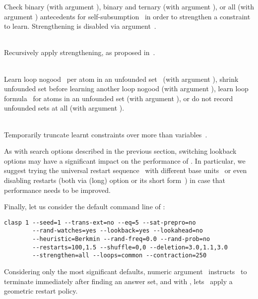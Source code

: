 \begin{description}
Check binary (with argument ),
binary and ternary (with argument ), or 
all (with argument ) antecedents for
self-subsumption~\cite{eenbie05a}
in order to strengthen a constraint to learn.
Strengthening is disabled via argument~.
\item[\code{--recursive-str}]~\\
Recursively apply strengthening, as proposed in~\cite{soreen05a}.
\item[\code{--loops common|distinct|shared|no}]~\\
Learn loop nogood~\cite{gekanesc07a} per atom in an unfounded set~\cite{gerosc91a}
(with argument ),
shrink unfounded set before learning another loop nogood
(with argument ),
learn loop formula~\cite{linzha04a} for atoms in an unfounded set
(with argument ),
or do not record unfounded sets at all
(with argument ).
\item[\code{--contraction \textit{n}}]~\\
Temporarily truncate learnt constraints over more than  variables~\cite{ryan04a}.
\end{description}
%
As with search options described in the previous section,
switching lookback options may have a significant impact on the
performance of \clasp.
In particular, we suggest trying the universal restart sequence~\cite{lusizu93a}
with different base units~ or even disabling restarts
(both via (long) option  or its short form~)
in case that performance needs to be improved.

Finally, let us consider the default command line of \clasp:
%
\begin{lstlisting}[numbers=none]
clasp 1 --seed=1 --trans-ext=no --eq=5 --sat-prepro=no
        --rand-watches=yes --lookback=yes --lookahead=no
        --heuristic=Berkmin --rand-freq=0.0 --rand-prob=no
        --restarts=100,1.5 --shuffle=0,0 --deletion=3.0,1.1,3.0
        --strengthen=all --loops=common --contraction=250
\end{lstlisting}
%
Considering only the most significant defaults,
numeric argument~ instructs \clasp\ to terminate immediately
after finding an answer set,
and with ,  lets \clasp\ apply a geometric
restart policy.

